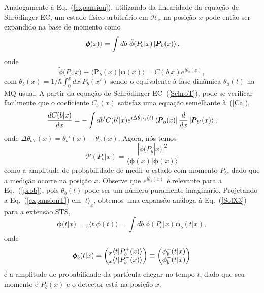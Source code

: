 Analogamente à Eq.~(\ref{expansion}), utilizando da linearidade da equação de Shrödinger EC, um estado físico arbitrário em ${\mathcal{H}}_x$ na posição $x$ pode então ser expandido na base de momento como
\begin{equation}\label{expansionT}
    \ket{{\pmb \phi}(x)}=\int db~ {\tilde \phi}(P_b|x) \ket{{\pmb P}_b(x)},
\end{equation}
onde
\begin{equation}\label{phiP}
   {\tilde \phi}(P_b|x)\equiv \langle \pmb{P}_b(x)|\pmb{\phi}(x)\rangle= C(b|x)e^{i\theta_b(x)},
\end{equation}
com $\theta_b(x)=1/\hbar\int_0^x d x^\prime P_b(x')$ sendo o equivalente à fase dinâmica $\theta_a(t)$ na MQ usual. A partir da equação de Schrödinger EC~(\ref{SchroT}), pode-se verificar facilmente que o coeficiente $C_b(x)$ satisfaz uma equação semelhante à~(\ref{Ca}),
\begin{equation}
    \frac{dC(b|x)}{dx}=-\int d{b'} C(b'|x)e^{i\Delta \theta_{b'b}(t)}\bra{\pmb{P}_b(x)}\frac{d}{dx}\ket{\pmb{P}_{b'}(x)},
\end{equation}
onde $\Delta \theta_{b'b}(x)=\theta_b'(x)-\theta_b(x)$. Agora, nós temos
\begin{equation}\label{prob}
{\mathcal P}(P_b|x)=\frac{|{\tilde \phi}(P_b|x)|^2}{{\langle \pmb{\phi}(x)|\pmb{\phi}(x) \rangle}}
\end{equation}
como a amplitude de probabilidade de medir o estado com momento $P_b$, dado que a medição ocorre na posição $x$. Observe que $e^{i \theta_b(x)}$ é relevante para a Eq.~(\ref{prob}), pois $\theta_b(t)$ pode ser um número puramente imaginário. Projetando a Eq.~(\ref{expansionT}) em $|t\rangle_x$, obtemos uma expansão análoga à Eq.~(\ref{SolX3}) para a extensão STS,
\begin{equation}\label{SolT3}
{\pmb \phi}(t|x)={_x\langle} t|\phi(t)\rangle=\int db ~{\tilde \phi}(P_b|x) {\pmb \phi}_b(t|x),
\end{equation}
onde  
\begin{equation}\label{phib}
   \pmb{\phi}_b(t|x)=\mqty({_x\langle} t|P^+_b(x)\rangle   \\ {_x\langle}t|P^-_b(x)\rangle)\equiv \mqty( \phi^+_b(t|x)   \\ \phi^-_b(t|x) )
\end{equation}
é a amplitude de probabilidade da partícula chegar no tempo $t$, dado que seu momento é $P_b(x)$ e o detector está na posição $x$. 


